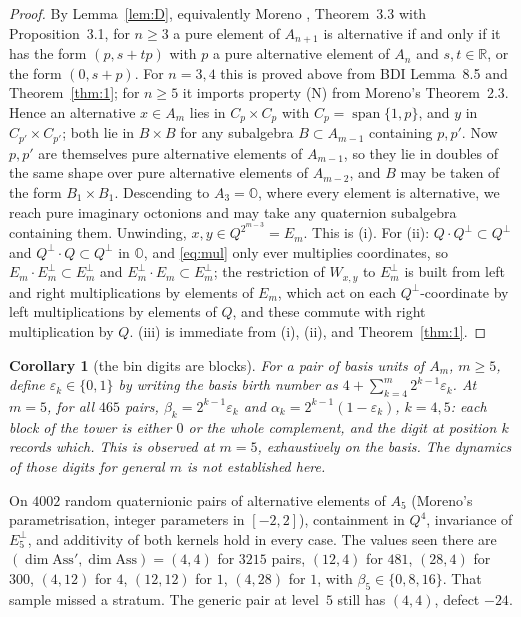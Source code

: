 \documentclass{baustms}
\theoremstyle{cupthm}
\newtheorem{cor}[thm]{Corollary}
\numberwithin{equation}{section}
\newcommand{\Ass}{\mathrm{Ass}}
\newcommand{\OO}{\mathbb{O}}
\newcommand{\RR}{\mathbb{R}}
\begin{document}
\begin{proof}
By Lemma~\ref{lem:D}, equivalently Moreno \cite{moreno}, Theorem~3.3 with Proposition~3.1, for $n\ge 3$ a pure element of $A_{n+1}$ is alternative if and only if it has the form $(p,s+tp)$ with $p$ a pure alternative element of $A_n$ and $s,t\in\RR$, or the form $(0,s+p)$. For $n=3,4$ this is proved above from BDI Lemma~8.5 and Theorem~\ref{thm:1}; for $n\ge 5$ it imports property (N) from Moreno's Theorem~2.3. Hence an alternative $x\in A_m$ lies in $C_p\times C_p$ with $C_p=\operatorname{span}\{1,p\}$, and $y$ in $C_{p'}\times C_{p'}$; both lie in $B\times B$ for any subalgebra $B\subset A_{m-1}$ containing $p,p'$. Now $p,p'$ are themselves pure alternative elements of $A_{m-1}$, so they lie in doubles of the same shape over pure alternative elements of $A_{m-2}$, and $B$ may be taken of the form $B_1\times B_1$. Descending to $A_3=\OO$, where every element is alternative, we reach pure imaginary octonions and may take any quaternion subalgebra containing them. Unwinding, $x,y\in Q^{2^{m-3}}=E_m$. This is (i). For (ii): $Q\cdot Q^\perp\subset Q^\perp$ and $Q^\perp\cdot Q\subset Q^\perp$ in $\OO$, and \eqref{eq:mul} only ever multiplies coordinates, so $E_m\cdot E_m^\perp\subset E_m^\perp$ and $E_m^\perp\cdot E_m\subset E_m^\perp$; the restriction of $W_{x,y}$ to $E_m^\perp$ is built from left and right multiplications by elements of $E_m$, which act on each $Q^\perp$-coordinate by left multiplications by elements of $Q$, and these commute with right multiplication by $Q$. (iii) is immediate from (i), (ii), and Theorem~\ref{thm:1}.
\end{proof}

\begin{cor}[the bin digits are blocks]\label{cor:5}
For a pair of basis units of $A_m$, $m\ge 5$, define $\varepsilon_k\in\{0,1\}$ by writing the basis birth number as $4+\sum_{k=4}^{m}2^{k-1}\varepsilon_k$. At $m=5$, for all $465$ pairs, $\beta_k=2^{k-1}\varepsilon_k$ and $\alpha_k=2^{k-1}(1-\varepsilon_k)$, $k=4,5$: each block of the tower is either $0$ or the whole complement, and the digit at position $k$ records which. This is observed at $m=5$, exhaustively on the basis. The dynamics of those digits for general $m$ is not established here.
\end{cor}

On $4002$ random quaternionic pairs of alternative elements of $A_5$ (Moreno's parametrisation, integer parameters in $[-2,2]$), containment in $Q^4$, invariance of $E_5^\perp$, and additivity of both kernels hold in every case. The values seen there are $(\dim\Ass',\dim\Ass)=(4,4)$ for $3215$ pairs, $(12,4)$ for $481$, $(28,4)$ for $300$, $(4,12)$ for $4$, $(12,12)$ for $1$, $(4,28)$ for $1$, with $\beta_5\in\{0,8,16\}$. That sample missed a stratum. The generic pair at level~$5$ still has $(4,4)$, defect $-24$.
\end{document}
